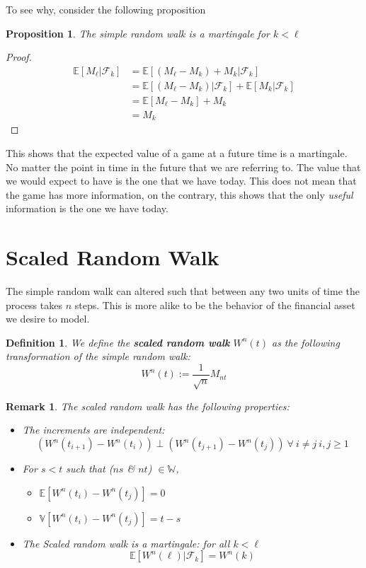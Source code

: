\documentclass[11pt]{report}
\newtheorem{definition}{Definition}[chapter]
\newtheorem{remark}{Remark}[chapter]
\newtheorem{proposition}{Proposition}[chapter]
\begin{document}
To see why, consider the following proposition

\begin{proposition}
	The simple random walk is a martingale for $k < \ell$
\end{proposition}

\begin{proof}
	\begin{align*}
				\mathbb{E}[M_\ell|\mathscr{F}_k] &= \mathbb{E}[(M_\ell - M_k) + M_k | \mathscr{F}_k] \\
				&= \mathbb{E}[(M_\ell - M_k) | \mathscr{F}_k] + \mathbb{E}[M_k | \mathscr{F}_k] \\
				&= \mathbb{E}[M_\ell - M_k] + M_k\\
				&= M_k
	\end{align*}
\end{proof}

This shows that the expected value of a game at a future time is a martingale. No matter the point in time in the future that we are referring to. The value that we would expect to have is the one that we have today. This does not mean that the game has more information, on the contrary, this shows that the only \textit{useful} information is the one we have today. \\


\section{Scaled Random Walk}
The simple random walk can altered such that between any two units of time the process takes $n$ steps. This is more alike to be the behavior of the financial asset we desire to model. 

\begin{definition}
	We define the \textbf{scaled random walk} $W^n(t)$ as the following transformation of the simple random walk:
	\[W^n(t) := \frac{1}{\sqrt{n}}M_{nt}\]
\end{definition}

\begin{remark}
	The scaled random walk has the following properties:
	\begin{itemize}
		\item The increments are independent: \[\left(W^n(t_{i+1}) - W^n(t_{i})\right) \perp \left(W^n(t_{j+1}) - W^n(t_{j})\right) \ \forall \ i \neq j \ i, j \geq 1\]
		\item For $s < t$ such that ($ns$ \& $nt$) $\in \mathbb{W}$, 
		\begin{itemize}
			\item $\mathbb{E}[W^n(t_{i}) - W^n(t_{j})] = 0$
			\item $\mathbb{V}[W^n(t_{i}) - W^n(t_{j})] = t - s$
		\end{itemize}
		\item The Scaled random walk is a martingale: for all $k < \ell$
		\[\mathbb{E}[W^n(\ell) | \mathscr{F}_k] = W^n(k)\]
	\end{itemize}
\end{remark}
\end{document}
